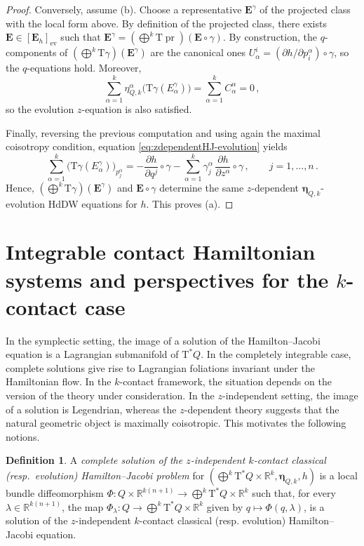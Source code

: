 \documentclass[11pt,twoside]{article}
\theoremstyle{plain}
\theoremstyle{definition}
\newtheorem{definition}[theorem]{Definition}
\theoremstyle{remark}
\newcommand{\T}{\mathrm{T}}
\begin{document}
\begin{proof}
Conversely, assume (b). Choose a representative $\mathbf E^\gamma$ of the projected class
with the local form above. By definition of the projected class, there exists
$\mathbf E\in [\mathbf E_h]_{\mathrm{ev}}$ such that
$\mathbf E^\gamma=(\bigoplus^k \T\operatorname{pr})(\mathbf E\circ\gamma)$. By construction,
the $q$-components of $(\bigoplus^k \T\gamma)(\mathbf E^\gamma)$ are the canonical ones
$U_\alpha^i=(\partial h/\partial p^\alpha_i)\circ\gamma$, so the $q$-equations hold.
Moreover,
\[
    \sum_{\alpha=1}^k \eta^\alpha_{Q,k}\bigl(\T\gamma(E^\gamma_\alpha)\bigr)
=\sum_{\alpha=1}^k C^\alpha_{\alpha}=0\,,
\]
so the evolution $z$-equation is also satisfied.

Finally, reversing the previous computation and using again the maximal coisotropy condition,
equation \eqref{eq:zdependentHJ-evolution} yields
\[
\sum_{\alpha=1}^k \bigl(\T\gamma(E^\gamma_\alpha)\bigr)_{p^\alpha_j}
=
-\frac{\partial h}{\partial q^j}\circ\gamma
-\sum_{\alpha=1}^k \gamma^\alpha_j\,\frac{\partial h}{\partial z^\alpha}\circ\gamma\,,
\qquad j=1,\dots,n\,.
\]
Hence, $(\bigoplus^k \T\gamma)(\mathbf E^\gamma)$ and $\mathbf E\circ\gamma$ determine the same
$z$-dependent $\bm\eta_{Q,k}$-evolution HdDW equations for $h$. This proves (a).
\end{proof}






\section{Integrable contact Hamiltonian systems and perspectives for the \texorpdfstring{$k$}{}-contact case}\label{sec:Integrable}

In the symplectic setting, the image of a solution of the Hamilton--Jacobi equation is a Lagrangian submanifold of \(\T^*Q\). In the completely integrable case, complete solutions give rise to Lagrangian foliations invariant under the Hamiltonian flow. In the \(k\)-contact framework, the situation depends on the version of the theory under consideration. In the \(z\)-independent setting, the image of a solution is Legendrian, whereas the \(z\)-dependent theory suggests that the natural geometric object is maximally coisotropic. This motivates the following notions.
 

\begin{definition}\label{Def:CompleteZindepen}
    A \emph{complete solution of the \(z\)-independent \(k\)-contact classical (resp.\ evolution) Hamilton--Jacobi  problem} for \((\bigoplus^k \T^*Q\times \mathbb R^k,\bm\eta_{Q,k},h)\) is a local bundle diffeomorphism \(\Phi\colon Q\times \mathbb R^{k(n+1)}\to \bigoplus^k \T^*Q\times \mathbb R^k\) such that, for every \(\lambda\in \mathbb R^{k(n+1)}\), the map $\Phi_\lambda\colon Q\to \bigoplus^k \T^*Q\times \mathbb R^k$ given by $q\mapsto \Phi(q,\lambda)$, is a solution of the $z$-independent \(k\)-contact classical (resp. evolution) Hamilton--Jacobi equation.
\end{definition}
\end{document}
